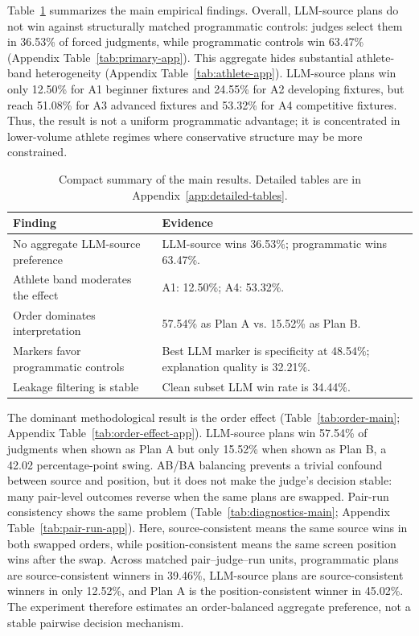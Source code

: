 \documentclass[11pt]{article}
\begin{document}
Table~\ref{tab:summary} summarizes the main empirical findings. Overall, LLM-source plans do not win against structurally matched programmatic controls: judges select them in 36.53\% of forced judgments, while programmatic controls win 63.47\% (Appendix Table~\ref{tab:primary-app}). This aggregate hides substantial athlete-band heterogeneity (Appendix Table~\ref{tab:athlete-app}). LLM-source plans win only 12.50\% for A1 beginner fixtures and 24.55\% for A2 developing fixtures, but reach 51.08\% for A3 advanced fixtures and 53.32\% for A4 competitive fixtures. Thus, the result is not a uniform programmatic advantage; it is concentrated in lower-volume athlete regimes where conservative structure may be more constrained.

\begin{table}[t]
\centering
\scriptsize
\setlength{\tabcolsep}{3pt}
\begin{tabular}{p{}p{}}
\toprule
Finding & Evidence \\
\midrule
No aggregate LLM-source preference & LLM-source wins 36.53\%; programmatic wins 63.47\%. \\
Athlete band moderates the effect & A1: 12.50\%; A4: 53.32\%. \\
Order dominates interpretation & 57.54\% as Plan A vs. 15.52\% as Plan B. \\
Markers favor programmatic controls & Best LLM marker is specificity at 48.54\%; explanation quality is 32.21\%. \\
Leakage filtering is stable & Clean subset LLM win rate is 34.44\%. \\
\bottomrule
\end{tabular}
\caption{Compact summary of the main results. Detailed tables are in Appendix~\ref{app:detailed-tables}.}
\label{tab:summary}
\end{table}

The dominant methodological result is the order effect (Table~\ref{tab:order-main}; Appendix Table~\ref{tab:order-effect-app}). LLM-source plans win 57.54\% of judgments when shown as Plan A but only 15.52\% when shown as Plan B, a 42.02 percentage-point swing. AB/BA balancing prevents a trivial confound between source and position, but it does not make the judge's decision stable: many pair-level outcomes reverse when the same plans are swapped. Pair-run consistency shows the same problem (Table~\ref{tab:diagnostics-main}; Appendix Table~\ref{tab:pair-run-app}). Here, source-consistent means the same source wins in both swapped orders, while position-consistent means the same screen position wins after the swap. Across matched pair--judge--run units, programmatic plans are source-consistent winners in 39.46\%, LLM-source plans are source-consistent winners in only 12.52\%, and Plan A is the position-consistent winner in 45.02\%. The experiment therefore estimates an order-balanced aggregate preference, not a stable pairwise decision mechanism.
\end{document}
